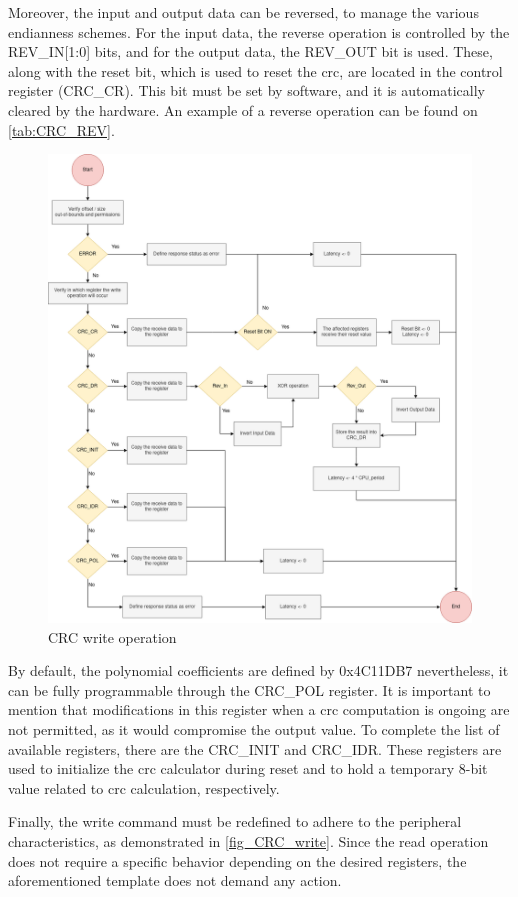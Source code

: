 Moreover, the input and output data can be reversed, to manage the various endianness schemes. For the input data, the reverse operation 
is controlled by the REV\_IN[1:0] bits, and for the output data, the REV\_OUT bit is used. These, along with the reset bit, which is used to 
reset the \gls{crc}, are located in the control register (CRC\_CR). This bit must be set by software, and it is automatically cleared by
the hardware. An example of a reverse operation can be found on \autoref{tab:CRC_REV}.

\begin{figure}[H]
	\centering
 	\includegraphics[width=0.66\linewidth]{Images/CRC_write.png}
 	\caption{CRC write operation}
	 \label{fig_CRC_write}
\end{figure}

By default, the polynomial coefficients are defined by 0x4C11DB7 nevertheless, it can be fully programmable through the CRC\_POL register.
It is important to mention that modifications in this register when a \gls{crc} computation is ongoing are not permitted, as it would 
compromise the output value. To complete the list of available registers, there are the CRC\_INIT and CRC\_IDR.  
These registers are used to initialize the \gls{crc} calculator during reset and to hold a temporary 8-bit value related to \gls{crc} 
calculation, respectively.

Finally, the write command must be redefined to adhere to the peripheral characteristics, as demonstrated in \autoref{fig_CRC_write}.
Since the read operation does not require a specific behavior depending on the desired registers, the aforementioned template does not demand any
action.   


